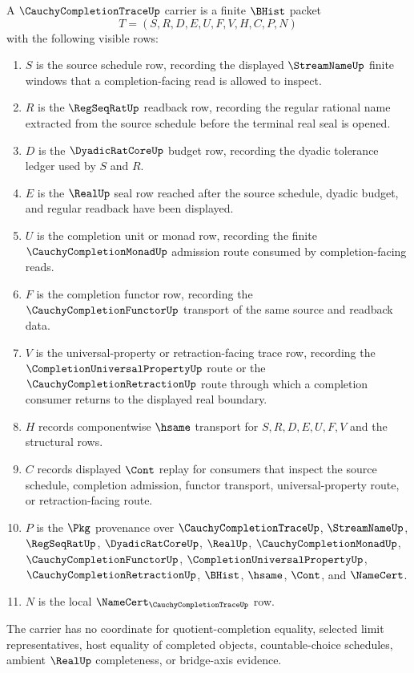 \begin{definition}
\label{def:cauchy-completion-trace-carrier}
A $\CauchyCompletionTraceUp$ carrier is a finite $\BHist$ packet
$$
T=(S,R,D,E,U,F,V,H,C,P,N)
$$
with the following visible rows:
\begin{enumerate}
\item $S$ is the source schedule row, recording the displayed $\StreamNameUp$ finite windows that a completion-facing read is allowed to inspect.
\item $R$ is the $\RegSeqRatUp$ readback row, recording the regular rational name extracted from the source schedule before the terminal real seal is opened.
\item $D$ is the $\DyadicRatCoreUp$ budget row, recording the dyadic tolerance ledger used by $S$ and $R$.
\item $E$ is the $\RealUp$ seal row reached after the source schedule, dyadic budget, and regular readback have been displayed.
\item $U$ is the completion unit or monad row, recording the finite $\CauchyCompletionMonadUp$ admission route consumed by completion-facing reads.
\item $F$ is the completion functor row, recording the $\CauchyCompletionFunctorUp$ transport of the same source and readback data.
\item $V$ is the universal-property or retraction-facing trace row, recording the $\CompletionUniversalPropertyUp$ route or the $\CauchyCompletionRetractionUp$ route through which a completion consumer returns to the displayed real boundary.
\item $H$ records componentwise $\hsame$ transport for $S,R,D,E,U,F,V$ and the structural rows.
\item $C$ records displayed $\Cont$ replay for consumers that inspect the source schedule, completion admission, functor transport, universal-property route, or retraction-facing route.
\item $P$ is the $\Pkg$ provenance over $\CauchyCompletionTraceUp$, $\StreamNameUp$, $\RegSeqRatUp$, $\DyadicRatCoreUp$, $\RealUp$, $\CauchyCompletionMonadUp$, $\CauchyCompletionFunctorUp$, $\CompletionUniversalPropertyUp$, $\CauchyCompletionRetractionUp$, $\BHist$, $\hsame$, $\Cont$, and $\NameCert$.
\item $N$ is the local $\NameCert_{\CauchyCompletionTraceUp}$ row.
\end{enumerate}
The carrier has no coordinate for quotient-completion equality, selected limit representatives, host equality of completed objects, countable-choice schedules, ambient $\RealUp$ completeness, or bridge-axis evidence.
\end{definition}

